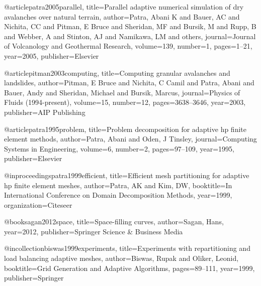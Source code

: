 @article{patra2005parallel,
  title={Parallel adaptive numerical simulation of dry avalanches over natural terrain},
  author={Patra, Abani K and Bauer, AC and Nichita, CC and Pitman, E Bruce and Sheridan, MF and Bursik, M and Rupp, B and Webber, A and Stinton, AJ and Namikawa, LM and others},
  journal={Journal of Volcanology and Geothermal Research},
  volume={139},
  number={1},
  pages={1--21},
  year={2005},
  publisher={Elsevier}
}

@article{pitman2003computing,
  title={Computing granular avalanches and landslides},
  author={Pitman, E Bruce and Nichita, C Camil and Patra, Abani and Bauer, Andy and Sheridan, Michael and Bursik, Marcus},
  journal={Physics of Fluids (1994-present)},
  volume={15},
  number={12},
  pages={3638--3646},
  year={2003},
  publisher={AIP Publishing}
}

@article{patra1995problem,
  title={Problem decomposition for adaptive hp finite element methods},
  author={Patra, Abani and Oden, J Tinsley},
  journal={Computing Systems in Engineering},
  volume={6},
  number={2},
  pages={97--109},
  year={1995},
  publisher={Elsevier}
}

@inproceedings{patra1999efficient,
  title={Efficient mesh partitioning for adaptive hp finite element meshes},
  author={Patra, AK and Kim, DW},
  booktitle={In International Conference on Domain Decomposition Methods},
  year={1999},
  organization={Citeseer}
}

@book{sagan2012space,
  title={Space-filling curves},
  author={Sagan, Hans},
  year={2012},
  publisher={Springer Science \& Business Media}
}

@incollection{biswas1999experiments,
  title={Experiments with repartitioning and load balancing adaptive meshes},
  author={Biswas, Rupak and Oliker, Leonid},
  booktitle={Grid Generation and Adaptive Algorithms},
  pages={89--111},
  year={1999},
  publisher={Springer}
}
